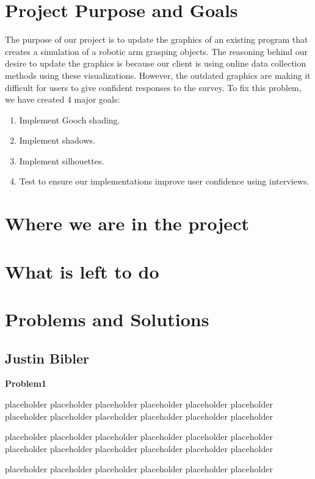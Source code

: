\documentclass[10pt,journal,compsoc,draftclsnofoot]{IEEEtran}
\begin{document}
\begin{flushleft}

\section{Project Purpose and Goals}
The purpose of our project is to update the graphics of an existing program that creates a simulation of a robotic arm grasping objects.
The reasoning behind our desire to update the graphics is because our client is using online data collection methods using these visualizations.
However, the outdated graphics are making it difficult for users to give confident responses to the survey.
To fix this problem, we have created 4 major goals:
\begin{enumerate}
\item Implement Gooch shading.
\item Implement shadows.
\item Implement silhouettes.
\item Test to ensure our implementations improve user confidence using interviews.
\end{enumerate}

\section{Where we are in the project}



\section{What is left to do}

\newpage

\section{Problems and Solutions}
\subsection{Justin Bibler}
\textbf{Problem1}
\par
placeholder placeholder placeholder placeholder placeholder placeholder
placeholder placeholder placeholder placeholder placeholder placeholder
\par
placeholder placeholder placeholder placeholder placeholder placeholder
placeholder placeholder placeholder placeholder placeholder placeholder
\par
placeholder placeholder placeholder placeholder placeholder placeholder


\end{flushleft}
\end{document}
